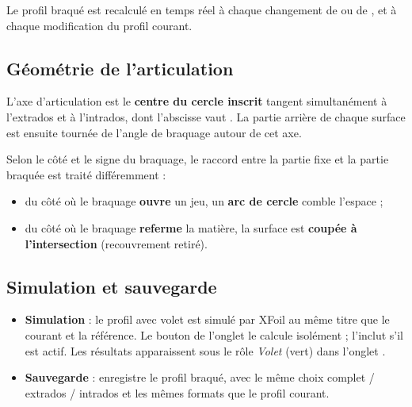 Le profil braqué est recalculé en temps réel à chaque changement
de  ou de , et à chaque modification du
profil courant.

\subsection{Géométrie de l'articulation}

L'axe d'articulation est le \textbf{centre du cercle inscrit}
tangent simultanément à l'extrados et à l'intrados, dont l'abscisse
vaut . La partie arrière de chaque surface est ensuite
tournée de l'angle de braquage autour de cet axe.


Selon le côté et le signe du braquage, le raccord entre la partie
fixe et la partie braquée est traité différemment :

\begin{itemize}
    \item du côté où le braquage \textbf{ouvre} un jeu, un
        \textbf{arc de cercle} comble l'espace ;
    \item du côté où le braquage \textbf{referme} la matière, la
        surface est \textbf{coupée à l'intersection} (recouvrement
        retiré).
\end{itemize}

\subsection{Simulation et sauvegarde}

\begin{itemize}
    \item \textbf{Simulation} : le profil avec volet est simulé par
        XFoil au même titre que le courant et la référence. Le bouton
         de l'onglet  le
        calcule isolément ;  l'inclut s'il est
        actif. Les résultats apparaissent sous le rôle
        \emph{Volet} (vert) dans l'onglet .
    \item \textbf{Sauvegarde} :  enregistre le profil
        braqué, avec le même choix complet / extrados / intrados et
        les mêmes formats que le profil courant.
\end{itemize}

